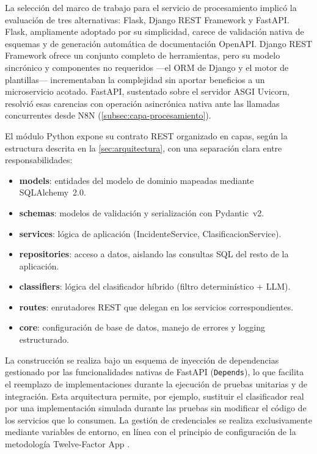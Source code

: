 La selección del marco de trabajo para el servicio de procesamiento implicó la evaluación de tres alternativas: Flask, Django REST Framework y FastAPI. Flask, ampliamente adoptado por su simplicidad, carece de validación nativa de esquemas y de generación automática de documentación OpenAPI. Django REST Framework ofrece un conjunto completo de herramientas, pero su modelo sincrónico y componentes no requeridos ---el ORM de Django y el motor de plantillas--- incrementaban la complejidad sin aportar beneficios a un microservicio acotado. FastAPI, sustentado sobre el servidor ASGI Uvicorn, resolvió esas carencias con operación asincrónica nativa ante las llamadas concurrentes desde N8N (\autoref{subsec:capa-procesamiento}).

El módulo Python expone su contrato REST organizado en capas, según la estructura descrita en la \autoref{sec:arquitectura}, con una separación clara entre responsabilidades:

\begin{itemize}
  \item \textbf{models}: entidades del modelo de dominio mapeadas mediante SQLAlchemy~2.0.
  \item \textbf{schemas}: modelos de validación y serialización con Pydantic~v2.
  \item \textbf{services}: lógica de aplicación (IncidenteService, ClasificacionService).
  \item \textbf{repositories}: acceso a datos, aislando las consultas SQL del resto de la aplicación.
  \item \textbf{classifiers}: lógica del clasificador híbrido (filtro determinístico + LLM).
  \item \textbf{routes}: enrutadores REST que delegan en los servicios correspondientes.
  \item \textbf{core}: configuración de base de datos, manejo de errores y logging estructurado.
\end{itemize}

La construcción se realiza bajo un esquema de inyección de dependencias gestionado por las funcionalidades nativas de FastAPI (\texttt{Depends}), lo que facilita el reemplazo de implementaciones durante la ejecución de pruebas unitarias y de integración. Esta arquitectura permite, por ejemplo, sustituir el clasificador real por una implementación simulada durante las pruebas sin modificar el código de los servicios que lo consumen. La gestión de credenciales se realiza exclusivamente mediante variables de entorno, en línea con el principio de configuración de la metodología Twelve-Factor App \parencite{Wiggins2017_12factor}.

